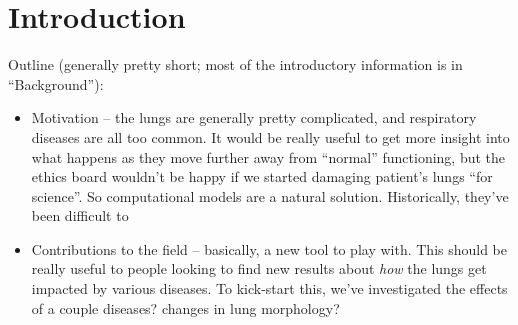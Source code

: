 %
\section{Introduction}

Outline (generally pretty short; most of the introductory information is in ``Background''):

\begin{itemize}
    \item Motivation -- the lungs are generally pretty complicated, and respiratory diseases are all
        too common. It would be really useful to get more insight into what happens as they move
        further away from ``normal'' functioning, but the ethics board wouldn't be happy if we
        started damaging patient's lungs ``for science''. So computational models are a natural
        solution. Historically, they've been difficult to 
    \item Contributions to the field -- basically, a new tool to play with. This should be really
        useful to people looking to find new results about \textit{how} the lungs get impacted by
        various diseases. To kick-start this, we've investigated the effects of a couple \textlangle
        diseases?  changes in lung morphology? \textrangle
\end{itemize}

